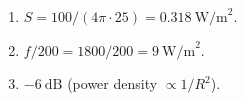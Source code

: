 \begin{enumerate}[leftmargin=1.6em,itemsep=2pt]
\item $S = 100/(4\pi\cdot25) = 0.318\ \text{W/m}^2$.
\item $f/200 = 1800/200 = 9\ \text{W/m}^2$.
\item $-6\ \text{dB}$ (power density $\propto 1/R^2$).
\end{enumerate}
